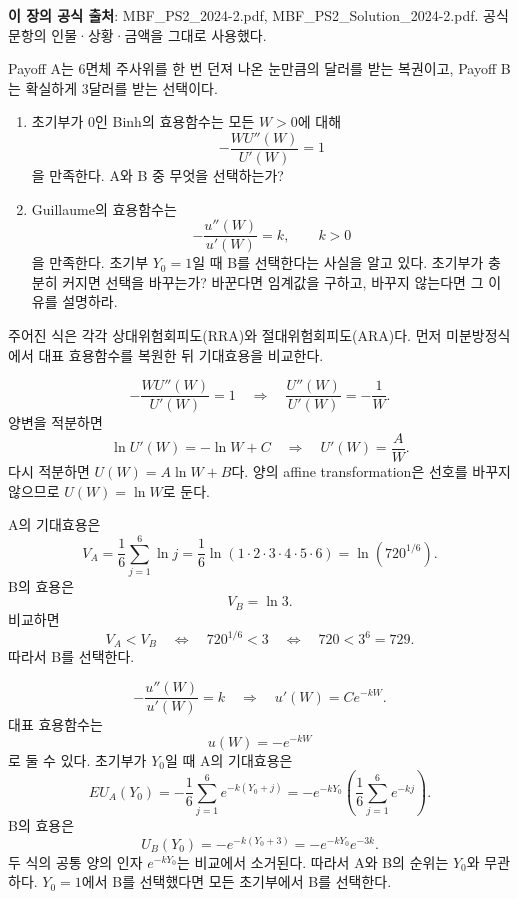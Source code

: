 
\begin{sourcebox}
\textbf{이 장의 공식 출처}: MBF\_PS2\_2024-2.pdf, MBF\_PS2\_Solution\_2024-2.pdf. 공식 문항의 인물·상황·금액을 그대로 사용했다.
\end{sourcebox}

\begin{officialbox}
Payoff A는 6면체 주사위를 한 번 던져 나온 눈만큼의 달러를 받는 복권이고, Payoff B는 확실하게 3달러를 받는 선택이다.
\begin{enumerate}[label=(\alph*)]
\item 초기부가 0인 Binh의 효용함수는 모든 $W>0$에 대해
\[
-\frac{WU''(W)}{U'(W)}=1
\]
을 만족한다. A와 B 중 무엇을 선택하는가?
\item Guillaume의 효용함수는
\[
-\frac{u''(W)}{u'(W)}=k,\qquad k>0
\]
을 만족한다. 초기부 $Y_0=1$일 때 B를 선택한다는 사실을 알고 있다. 초기부가 충분히 커지면 선택을 바꾸는가? 바꾼다면 임계값을 구하고, 바꾸지 않는다면 그 이유를 설명하라.
\end{enumerate}
\end{officialbox}

\begin{strategybox}
주어진 식은 각각 상대위험회피도(RRA)와 절대위험회피도(ARA)다. 먼저 미분방정식에서 대표 효용함수를 복원한 뒤 기대효용을 비교한다.
\end{strategybox}

\begin{solutionbox}
\[
-\frac{WU''(W)}{U'(W)}=1
\quad\Longrightarrow\quad
\frac{U''(W)}{U'(W)}=-\frac1W.
\]
양변을 적분하면
\[
\ln U'(W)=-\ln W+C
\quad\Longrightarrow\quad U'(W)=\frac{A}{W}.
\]
다시 적분하면 $U(W)=A\ln W+B$다. 양의 affine transformation은 선호를 바꾸지 않으므로 $U(W)=\ln W$로 둔다.

A의 기대효용은
\[
V_A=\frac16\sum_{j=1}^6\ln j
=\frac16\ln(1\cdot2\cdot3\cdot4\cdot5\cdot6)
=\ln\left(720^{1/6}\right).
\]
B의 효용은
\[
V_B=\ln3.
\]
비교하면
\[
V_A<V_B
\quad\Longleftrightarrow\quad
720^{1/6}<3
\quad\Longleftrightarrow\quad
720<3^6=729.
\]
따라서 B를 선택한다.

\[
-\frac{u''(W)}{u'(W)}=k
\quad\Longrightarrow\quad
u'(W)=Ce^{-kW}.
\]
대표 효용함수는
\[
u(W)=-e^{-kW}
\]
로 둘 수 있다. 초기부가 $Y_0$일 때 A의 기대효용은
\[
EU_A(Y_0)=-\frac16\sum_{j=1}^6 e^{-k(Y_0+j)}
=-e^{-kY_0}\left(\frac16\sum_{j=1}^6e^{-kj}\right).
\]
B의 효용은
\[
U_B(Y_0)=-e^{-k(Y_0+3)}=-e^{-kY_0}e^{-3k}.
\]
두 식의 공통 양의 인자 $e^{-kY_0}$는 비교에서 소거된다. 따라서 A와 B의 순위는 $Y_0$와 무관하다. $Y_0=1$에서 B를 선택했다면 모든 초기부에서 B를 선택한다.
\end{solutionbox}

